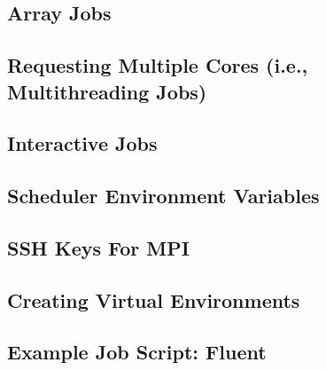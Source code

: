 \documentclass{easychair}
\begin{document}
\subsection{Array Jobs}
\label{sect:array-jobs}


\subsection{Requesting Multiple Cores (i.e., Multithreading Jobs)}
\label{sect:requesting-multiple-cores}


\subsection{Interactive Jobs}
\label{sect:interactive-jobs}


\subsection{Scheduler Environment Variables}
\label{sect:scheduler-environment-variables}


\subsection{SSH Keys For MPI}
\label{sect:ssh-keys-for-mpi}


\subsection{Creating Virtual Environments}
\label{sect:creating-virtual-environments}


\subsection{Example Job Script: Fluent}
\label{sect:example-job-fluent}

\end{document}
